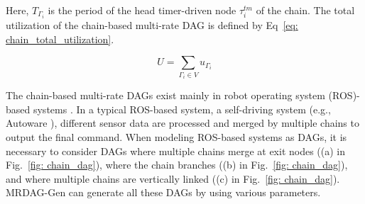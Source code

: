 \noindent Here, $T_{\Gamma_i}$ is the period of the head timer-driven node $\tau^{tm}_i$ of the chain.
The total utilization of the chain-based multi-rate DAG is defined by Eq~\ref{eq: chain_total_utilization}.

\begin{equation}
    \label{eq: chain_total_utilization}
    U = \sum_{\Gamma_i \in V}u_{\Gamma_i}
\end{equation}

The chain-based multi-rate DAGs exist mainly in robot operating system (ROS)-based systems \cite{casini2019response, choi2021picas}.
In a typical ROS-based system, a self-driving system (e.g., Autoware \cite{future}), different sensor data are processed and merged by multiple chains to output the final command.
When modeling ROS-based systems as DAGs, it is necessary to consider DAGs where multiple chains merge at exit nodes ((a) in Fig.~\ref{fig: chain_dag}), where the chain branches ((b) in Fig.~\ref{fig: chain_dag}), and where multiple chains are vertically linked ((c) in Fig.~\ref{fig: chain_dag}).
MRDAG-Gen can generate all these DAGs by using various parameters.
